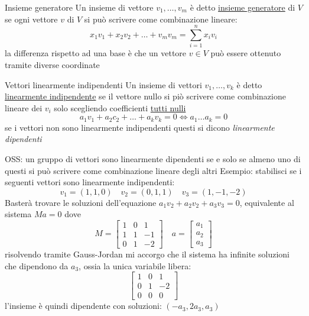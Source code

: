 \begin{definizione}{Insieme generatore}
	Un insieme di vettore $ v_1,\ldots,v_m$ è detto \underline{insieme generatore} di $V$ se ogni vettore $v$ di $V$ si può scrivere come combinazione lineare:
	\[
		x_1v_1+x_2v_2+\ldots+v_mv_m =  \sum_{i=1}^{n} x_iv_i
	\]
	la differenza rispetto ad una base è che un vettore $v \in  V$ può essere ottenuto tramite diverse coordinate
\end{definizione}

\begin{definizione}{Vettori linearmente indipendenti}
	Un insieme di vettori $v_1,\ldots, v_k$ è detto \underline{linearmente indipendente} se il vettore nullo si piò scrivere come combinazione lineare dei $v_i$ solo scegliendo coefficienti  \underline{tutti nulli}
	\[
		a_1v_1+a_2c_2+\ldots+ a_kv_k=0 \Leftrightarrow a_1\ldots a_k=0
	\]
	se i vettori non sono linearmente indipendenti questi si dicono \textit{linearmente dipendenti}
\end{definizione}

OSS: un gruppo di vettori sono linearmente dipendenti se e solo se almeno uno di questi si può scrivere come combinazione lineare degli altri
\vskip3mm
Esempio: stabilisci se i seguenti vettori sono linearmente indipendenti:
\[
	v_1= \left( 1,1,0 \right) \quad v_2=\left( 0,1,1 \right) \quad v_3=\left( 1,-1,-2 \right)
\]
Basterà trovare le soluzioni dell'equazione $a_1v_2+a_2v_2+a_3v_3=0$, equivalente al sistema $Ma=0$ dove
\[
	M=
	\begin{bmatrix}
		1 & 0 & 1  \\
		1 & 1 & -1 \\
		0 & 1 & -2
	\end{bmatrix}
	\quad
	a =
	\begin{bmatrix}
		a_1 \\
		a_2 \\
		a_3
	\end{bmatrix}
\]
risolvendo tramite Gauss-Jordan mi accorgo che il sistema ha infinite soluzioni che dipendono da $a_3$, ossia la unica variabile libera:
\[
	\begin{bmatrix}
		1 & 0 & 1  \\
		0 & 1 & -2 \\
		0 & 0 & 0
	\end{bmatrix}
\]
l'insieme è quindi dipendente con soluzioni: $\left( -a_3,2a_3,a_3 \right) $


